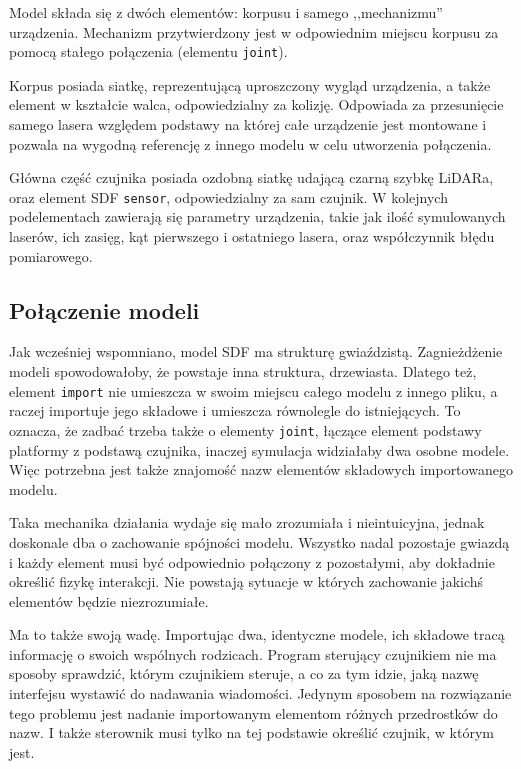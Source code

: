 	Model składa się z dwóch elementów: korpusu i samego ,,mechanizmu'' urządzenia.
	Mechanizm przytwierdzony jest w odpowiednim miejscu korpusu za pomocą stałego połączenia (elementu \texttt{joint}).

	Korpus posiada siatkę, reprezentującą uproszczony wygląd urządzenia, a także element w kształcie walca, odpowiedzialny za kolizję.
	Odpowiada za przesunięcie samego lasera względem podstawy na której całe urządzenie jest montowane i pozwala na wygodną referencję z innego modelu w celu utworzenia połączenia.

	Główna część czujnika posiada ozdobną siatkę udającą czarną szybkę LiDARa, oraz element SDF \texttt{sensor}, odpowiedzialny za sam czujnik.
	W kolejnych podelementach zawierają się parametry urządzenia, takie jak ilość symulowanych laserów, ich zasięg, kąt pierwszego i ostatniego lasera, oraz współczynnik błędu pomiarowego.

	\subsection{Połączenie modeli}
		Jak wcześniej wspomniano,
		model SDF ma strukturę gwiaździstą. 
		Zagnieżdżenie modeli spowodowałoby, że powstaje inna struktura, drzewiasta.
		Dlatego też, element \texttt{import} nie umieszcza w swoim miejscu całego modelu z innego pliku, a raczej importuje jego składowe i umieszcza równolegle do istniejących.
		To oznacza, że zadbać trzeba także o elementy \texttt{joint}, łączące element podstawy platformy z podstawą czujnika, inaczej symulacja widziałaby dwa osobne modele.
		Więc potrzebna jest także znajomość nazw elementów składowych importowanego modelu.

		Taka mechanika działania wydaje się mało zrozumiała i nieintuicyjna, jednak doskonale dba o zachowanie spójności modelu.
		Wszystko nadal pozostaje gwiazdą i każdy element musi być odpowiednio połączony z pozostałymi, aby dokładnie określić fizykę interakcji.
		Nie powstają sytuacje w których zachowanie jakichś elementów będzie niezrozumiałe.

		Ma to także swoją wadę. Importując dwa, identyczne modele, ich składowe tracą informację o swoich wspólnych rodzicach.
		Program sterujący czujnikiem nie ma sposoby sprawdzić, którym czujnikiem steruje, a co za tym idzie, jaką nazwę interfejsu wystawić do nadawania wiadomości.
		Jedynym sposobem na rozwiązanie tego problemu jest nadanie importowanym elementom różnych przedrostków do nazw.
		I także sterownik musi tylko na tej podstawie określić czujnik, w którym jest.

